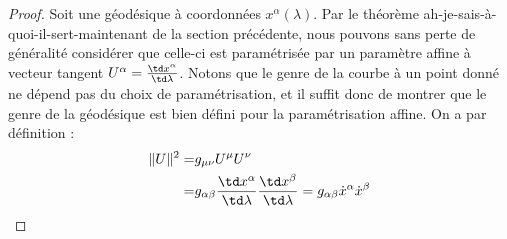 \begin{proof}
    Soit une géodésique à coordonnées $x^{\alpha}(\lambda)$. Par le théorème ah-je-sais-à-quoi-il-sert-maintenant de la section précédente, nous pouvons sans perte de généralité considérer que celle-ci est paramétrisée par un paramètre affine à vecteur tangent  $U^{\alpha} = \frac{\td x^{\alpha}}{\td\lambda}$. Notons que le genre de la courbe à un point donné ne dépend pas du choix de paramétrisation, et il suffit donc de montrer que le genre de la géodésique est bien défini pour la paramétrisation affine. On a par définition :
    \begin{align}
        \Vert  U \Vert ^2 =& g_{\mu \nu}U^{\mu}U^{\nu}\\
        =& g_{\alpha \beta}\frac{\td x^{\alpha}}{\td \lambda}\frac{\td x^{\beta}}{\td \lambda} = g_{\alpha\beta} \dot{x}^\alpha \dot{x}^\beta
    \end{align}


\end{proof}
